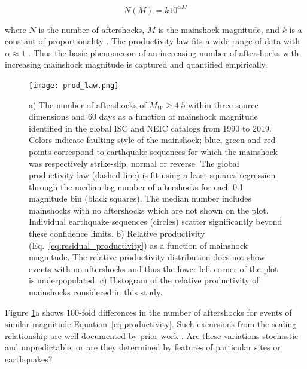 \documentclass[draft, jgrga]{agujournal2018}
\begin{document}
\begin{linenomath*}
\begin{equation}\label{eq:productivity}
    N(M)=k10^{\alpha M}
\end{equation}
\end{linenomath*}
%
where $N$ is the number of aftershocks, $M$ is the mainshock magnitude, and $k$ is a constant of proportionality  \citep{Reasenberg1989}. The productivity law fits a wide range of data with $\alpha\approx1$ \citep{Reasenberg1989, Yamanaka1990scalingshock,  DeArcangelis2016, Kisslinger1996,Tahir2015,Tahir2014Aftershock2005, Page}. Thus the basic phenomenon of an increasing number of aftershocks with increasing mainshock magnitude is captured and quantified empirically.

    \begin{figure}
        \centering
        \texttt{[image: prod\_law.png]}
        \caption{a) The number of aftershocks of $M_W\ge4.5$ within three source dimensions and 60 days as a function of mainshock magnitude identified in the global ISC and NEIC catalogs from 1990 to 2019. Colors indicate faulting style of the mainshock; blue, green and red points correspond to earthquake sequences for which the mainshock was respectively strike-slip, normal or reverse. The global productivity law (dashed line) is fit using a least squares regression through the median log-number of aftershocks for each 0.1 magnitude bin (black squares). The median number includes mainshocks with no aftershocks which are not shown on the plot.  Individual earthquake sequences (circles) scatter significantly beyond these confidence limits. b) Relative productivity (Eq.~\ref{eq:residual_productivity}) as a function of mainshock magnitude. The relative productivity distribution does not show events with no aftershocks and thus the lower left corner of the plot is underpopulated. c) Histogram of the relative productivity of mainshocks considered in this study.
        }
        \label{fig:fms_prod}
    \end{figure}

 Figure \ref{fig:fms_prod}a shows 100-fold differences in the number of aftershocks for events of similar magnitude Equation~\ref{eq:productivity}. Such excursions from the scaling relationship are well documented by prior work \citep[e.g.][]{Marsan2017HowAftershocks,Boettcher2004EarthquakeFaults,Page,Tahir2014Aftershock2005}. Are these variations stochastic and unpredictable, or are they determined by features of particular sites or earthquakes?
\end{document}

